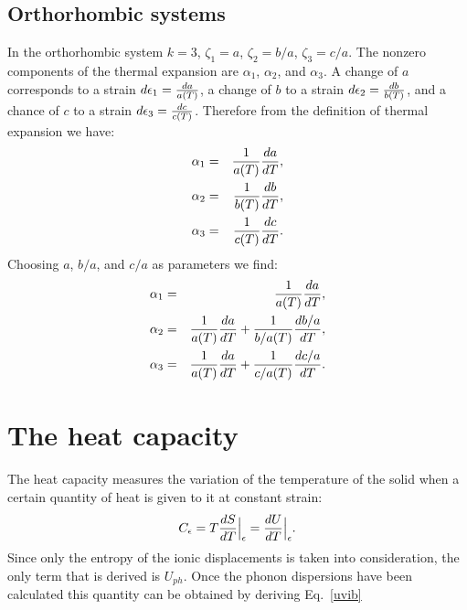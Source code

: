 \documentclass[12pt,a4paper]{article}
\begin{document}
\subsection{\color{web-blue}Orthorhombic systems}
In the orthorhombic system $k=3$, $\zeta_1=a$, $\zeta_2=b/a$, 
$\zeta_3=c/a$. The nonzero components of the thermal expansion are 
$\alpha_{1}$, $\alpha_{2}$, and $\alpha_{3}$. 
A change of $a$ corresponds to a strain ${d\epsilon_1}={da\over a(T)}$,  
a change of $b$ to a strain ${d\epsilon_2}={db\over b(T)}$,  
and a chance of $c$ to a strain ${d\epsilon_3}={dc\over c(T)}$. 
Therefore from the definition of thermal expansion we have:  
\begin{eqnarray}
\alpha_{1} &=&  {1\over a(T) } {d a \over dT}, \\ 
\alpha_{2} &=&  {1\over b(T) } {d b \over dT}, \\
\alpha_{3} &=&  {1\over c(T) } {d c \over dT}.
\end{eqnarray}
Choosing $a$, $b/a$, and $c/a$ as parameters we find:
\begin{eqnarray}
\alpha_1 &=& {1\over a(T)} {d a \over dT}, \\
\alpha_2 &=& {1\over a(T)} {da \over d T}  + {1\over b/a(T)} {d b/a \over dT}, \\
\alpha_3 &=& {1\over a(T)} {da \over d T}  + {1\over c/a(T)} {d c/a \over dT}.
\end{eqnarray}



\newpage
\section{\color{coral}The heat capacity}
The heat capacity measures the variation of the temperature of the solid
when a certain quantity of heat is given to it at constant strain:
\begin{equation}
C_\epsilon= T {d S \over dT}\Big|_\epsilon = { d U \over d T}\Big|_\epsilon.
\end{equation}
Since only the entropy of the ionic displacements is taken into consideration,
the only term that is derived is $U_{ph}$. Once the phonon dispersions 
have been calculated this quantity can be obtained by deriving Eq.~\ref{uvib}
\end{document}
